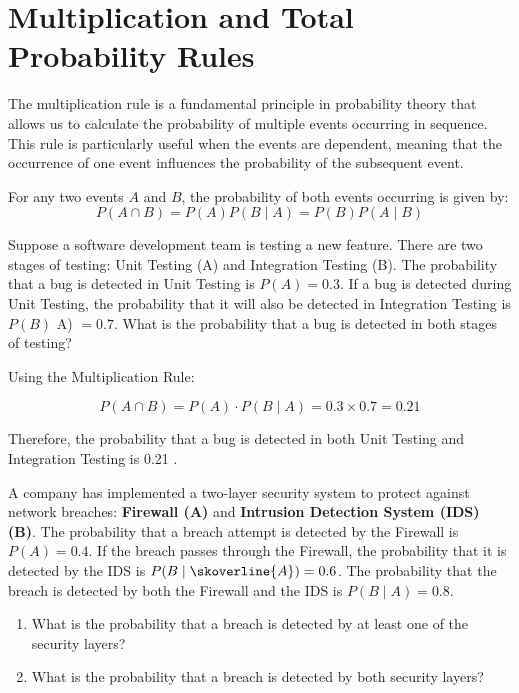\section{Multiplication and Total Probability Rules}
The multiplication rule is a fundamental principle in probability theory that allows us to calculate the probability of multiple events occurring in sequence. This rule is particularly useful when the events are dependent, meaning that the occurrence of one event influences the probability of the subsequent event.

\begin{theorem}
    For any two events \( A \) and \( B \), the probability of both events occurring is given by:
    \[
    P(A \cap B) = P(A) P(B \mid A) = P(B) P(A \mid B)
    \]
\end{theorem}

\begin{example}
    Suppose a software development team is testing a new feature. There are two stages of testing: Unit Testing (A) and Integration Testing (B). The probability that a bug is detected in Unit Testing is $P(A)=0.3$. If a bug is detected during Unit Testing, the probability that it will also be detected in Integration Testing is $P(B)$ A) $=0.7$. What is the probability that a bug is detected in both stages of testing?
\end{example}

\begin{solution}
    Using the Multiplication Rule:

\[
P(A \cap B)=P(A) \cdot P(B \mid A)=0.3 \times 0.7=0.21
\]


Therefore, the probability that a bug is detected in both Unit Testing and Integration Testing is 0.21 .
\end{solution}

\begin{example}
A company has implemented a two-layer security system to protect against network breaches: \textbf{Firewall (A)} and \textbf{Intrusion Detection System (IDS) (B)}. The probability that a breach attempt is detected by the Firewall is \( P(A) = 0.4 \). If the breach passes through the Firewall, the probability that it is detected by the IDS is \( P(B \mid \skoverline{A}) = 0.6 \). The probability that the breach is detected by both the Firewall and the IDS is \( P(B \mid A) = 0.8 \).

\begin{enumerate}[label=(\alph*)]
    \item What is the probability that a breach is detected by at least one of the security layers?
    \item What is the probability that a breach is detected by both security layers?
\end{enumerate}

\end{example}

